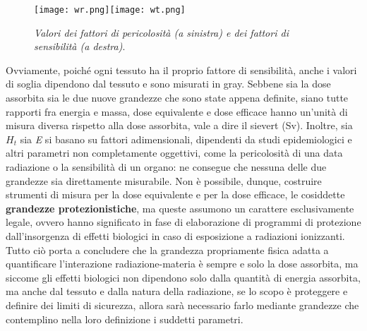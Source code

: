 \documentclass{report}
\numberwithin{equation}{section}
\numberwithin{figure}{section}
\begin{document}
\begin{figure}[htp]
\centering
\texttt{[image: wr.png]}\quad\texttt{[image: wt.png]}
\caption{\label{fig:w} \textit{Valori dei fattori di pericolosità (a sinistra) e dei fattori di sensibilità (a destra)}.}
\end{figure}

Ovviamente, poiché ogni tessuto ha il proprio fattore di sensibilità, anche i valori di soglia dipendono dal tessuto e sono misurati in gray. Sebbene sia la dose assorbita sia le due nuove grandezze che sono state appena definite, siano tutte rapporti fra energia e massa, dose equivalente e dose efficace hanno un'unità di misura diversa rispetto alla dose assorbita, vale a dire il sievert (Sv). Inoltre, sia $H_t$ sia \textit{E} si basano su fattori adimensionali, dipendenti da studi epidemiologici e altri parametri non completamente oggettivi, come la pericolosità di una data radiazione o la sensibilità di un organo: ne consegue che nessuna delle due grandezze sia direttamente misurabile. Non è possibile, dunque, costruire strumenti di misura per la dose equivalente e per la dose efficace, le cosiddette \textbf{grandezze protezionistiche}, ma queste assumono un carattere esclusivamente legale, ovvero hanno significato in fase di elaborazione di programmi di protezione dall'insorgenza di effetti biologici in caso di esposizione a radiazioni ionizzanti. Tutto ciò porta a concludere che la grandezza propriamente fisica adatta a quantificare l'interazione radiazione-materia è sempre e solo la dose assorbita, ma siccome gli effetti biologici non dipendono solo dalla quantità di energia assorbita, ma anche dal tessuto e dalla natura della radiazione, se lo scopo è proteggere e definire dei limiti di sicurezza, allora sarà necessario farlo mediante grandezze che contemplino nella loro definizione i suddetti parametri.
\end{document}
